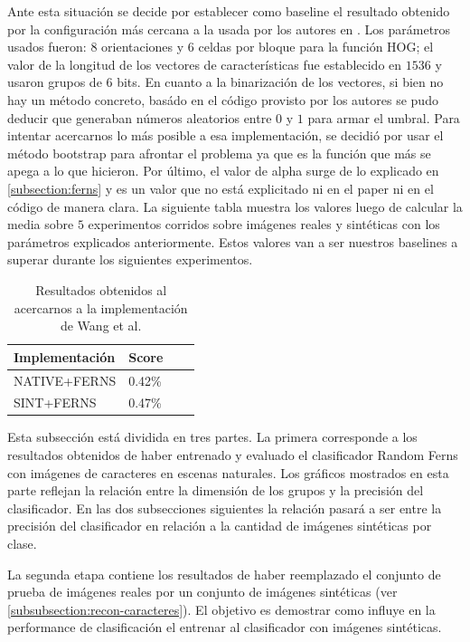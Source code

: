 	Ante esta situación se decide por establecer como baseline el resultado obtenido por la configuración más cercana a la usada por los autores en \cite{wang}. Los parámetros usados fueron: $8$ orientaciones y $6$ celdas por bloque para la función HOG; el valor de la longitud de los vectores de características fue establecido en $1536$ y usaron grupos de $6$ bits. En cuanto a la binarización de los vectores, si bien no hay un método concreto, basádo en el código provisto por los autores se pudo deducir que generaban números aleatorios entre $0$ y $1$ para armar el umbral. Para intentar acercarnos lo más posible a esa implementación, se decidió por usar el método bootstrap para afrontar el problema ya que es la función que más se apega a lo que hicieron. Por último, el valor de alpha surge de lo explicado en \ref{subsection:ferns} y es un valor que no está explicitado ni en el paper ni en el código de manera clara. La siguiente tabla muestra los valores luego de calcular la media sobre $5$ experimentos corridos sobre imágenes reales y sintéticas con los parámetros explicados anteriormente. Estos valores van a ser nuestros baselines a superar durante los siguientes experimentos.
	
	\begin{table}
		\centering
	    \begin{tabular}{ | l | l | l | p{5cm} |}
    			\hline
    				\textbf{Implementación} & \textbf{Score} \\ \hline
    				NATIVE+FERNS & 0.42\% \\ \hline
    				SINT+FERNS & 0.47\% \\
    			\hline
    		\end{tabular}	
    		\caption[Resultados reales y sintéticas para baseline]{Resultados obtenidos al acercarnos a la implementación de Wang et al.}
    		\label{table: Baseline}
	\end{table}
	 
	Esta subsección está dividida en tres partes. La primera corresponde a los resultados obtenidos de haber entrenado y evaluado el clasificador Random Ferns con imágenes de caracteres en escenas naturales. Los gráficos mostrados en esta parte reflejan la relación entre la dimensión de los grupos y la precisión del clasificador. En las dos subsecciones siguientes la relación pasará a ser entre la precisión del clasificador en relación a la cantidad de imágenes sintéticas por clase.
	
	La segunda etapa contiene los resultados de haber reemplazado el conjunto de prueba de imágenes reales por un conjunto de imágenes sintéticas (ver \ref{subsubsection:recon-caracteres}). El objetivo es demostrar como influye en la performance de clasificación el entrenar al clasificador con imágenes sintéticas.
	
